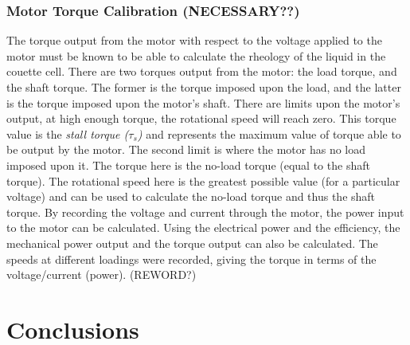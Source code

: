 \documentclass[a4]{report}
\def\achapter{preamble}  %
\begin{document}
	\subsection{Motor Torque Calibration (NECESSARY??)}
	The torque output from the motor with respect to the voltage applied to the motor must be known to be able to calculate the rheology of the liquid in the couette cell. There are two torques output from the motor: the load torque, and the shaft torque. The former is the torque imposed upon the load, and the latter is the torque imposed upon the motor's shaft. \newline \newline \noindent 
	There are limits upon the motor's output, at high enough torque, the rotational speed will reach zero. This torque value is the \textit{stall torque (\(\tau_s\))} and represents the maximum value of torque able to be output by the motor. The second limit is where the motor has no load imposed upon it. The torque here is the no-load torque (equal to the shaft torque). The rotational speed here is the greatest possible value (for a particular voltage) and can be used to calculate the no-load torque and thus the shaft torque. \newline \newline \noindent
	By recording the voltage and current through the motor, the power input to the motor can be calculated. Using the electrical power and the efficiency, the mechanical power output and the torque output can also be calculated. The speeds at different loadings were recorded, giving the torque in terms of the voltage/current (power). (REWORD?)



	\chapter*{Conclusions}
	\def\achapter{Conclusions}
	
\end{document}
